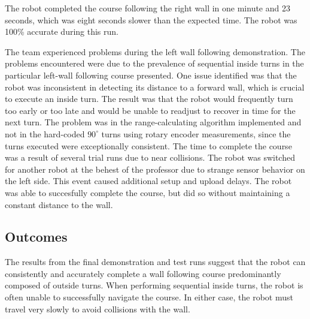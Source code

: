 The robot completed the course following the right wall in one minute
and 23 seconds, which was eight seconds slower than the expected
time. The robot was 100\% accurate during this run.

The team experienced problems during the left wall following
demonstration. The problems encountered were due to the prevalence of
sequential inside turns in the particular left-wall following course
presented. One issue identified was that the robot was inconsistent in
detecting its distance to a forward wall, which is crucial to execute
an inside turn. The result was that the robot would frequently turn
too early or too late and would be unable to readjust to recover in
time for the next turn. The
problem was in the range-calculating algorithm implemented and not in the
hard-coded \(90^\circ\) turns using rotary encoder measurements, since
the turns executed were exceptionally consistent. The time to complete the
course was a result of several trial runs due to near collisions. The
robot was switched for another robot at the behest of the professor
due to strange sensor behavior on the left side. This event caused
additional setup and upload delays. The robot was able to succesfully
complete the course, but did so without maintaining a constant
distance to the wall.

\subsection{Outcomes}

The results from the final demonstration and test runs suggest that
the robot can consistently and accurately complete a wall following
course predominantly composed of outside turns. When performing
sequential inside turns, the robot is often unable to successfully
navigate the course. In either case, the robot must travel very slowly
to avoid collisions with the wall. 






